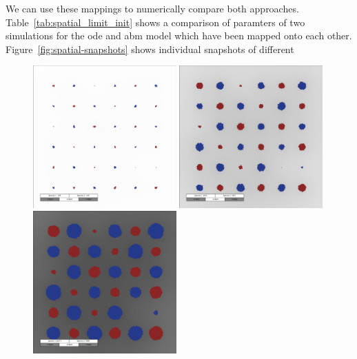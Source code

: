 \documentclass[10pt,A4paper]{article}
\numberwithin{equation}{section}
\begin{document}
We can use these mappings to numerically compare both approaches.
Table~\ref{tab:spatial_limit_init} shows a comparison of paramters of two simulations for the \ac{ode} and \ac{abm} model which have been mapped onto each other.
Figure~\ref{fig:spatial-snapshots} shows individual snapshots of different 
%
\begin{figure}
    \includegraphics[width=0.49\textwidth]{Figures/abm-homogenous/snapshot_00006000.png}\hspace{0.02\textwidth}%
    \includegraphics[width=0.49\textwidth]{Figures/abm-homogenous/snapshot_00012000.png}\vspace{0.02\textwidth}\\
    \includegraphics[width=0.49\textwidth]{Figures/abm-homogenous/snapshot_00018000.png}\hspace{0.02\textwidth}%

\end{figure}
\end{document}

